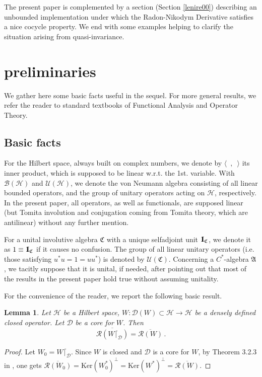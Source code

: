 \documentclass[12pt]{amsart}
\numberwithin{equation}{section}
\def\cb{{\mathcal B}}
\def\ch{{\mathcal H}}
\def\cu{{\mathcal U}}
\def\ga{{\mathfrak A}} \def\gpa{{\mathfrak a}}
\def\gc{{\mathfrak C}}
\newtheorem{lem}[thm]{Lemma}
\def\idd{{1}\!\!{\rm I}}
\begin{document}
The present paper is complemented by a section (Section \ref{lenire00}) describing an unbounded implementation under which the Radon-Nikodym Derivative satisfies a nice cocycle property. We end with some examples helping to clarify the situation arising from quasi-invariance.


\section{preliminaries}
\label{ptmgv}

We gather here some basic facts useful in the sequel. For more general results, we refer the reader to standard textbooks of Functional Analysis and Operator Theory.
\subsection{Basic facts} 
For the Hilbert space, always built on complex numbers, we denote by $\langle\,\,\,,\,\,\,\rangle$ its inner product, which is supposed to be linear w.r.t. the 1st. variable. With $\cb(\ch)$ and $\cu(\ch)$, we denote the von Neumann algebra consisting of all linear bounded operators, and the group of unitary operators acting on $\ch$, respectively. In the present paper, all operators, as well as functionals, are supposed linear (but Tomita involution and conjugation coming from Tomita theory, which are antilinear) without any further mention.

For a unital involutive algebra $\gc$ with a unique selfadjoint unit $\idd_{\gc}$, we denote it as $1\equiv\idd_{\gc}$ if it causes no confusion. The group of all linear unitary operators (i.e. those satisfying $u^*u=1=uu^*$) is denoted by $\cu(\gc)$. Concerning  a $C^*$-algebra $\ga$, we tacitly suppose that it is unital, if needed, after pointing out that most of the results in the present paper hold true without assuming unitality.

For the convenience of the reader, we report the following basic result.
\begin{lem}
\label{piuno}
Let $\mathcal H$ be a Hilbert space, $W:\mathcal D(W)\subset \mathcal H\rightarrow \mathcal H$ be a densely defined closed operator. Let $\mathcal D$ be a core for $W$. Then
$$
\overline{\mathcal R(W\lceil_\mathcal D)}=\overline{\mathcal R(W)}\,.
$$ 
\end{lem}
\begin{proof}
 Let $W_0=W\lceil_\mathcal D$. Since $W$ is closed and $\mathcal D$ is a core for $W$, by Theorem 3.2.3 in \cite{D}, one gets
$\overline{\mathcal R(W_0)}=\mbox{Ker}(W_0^*)^\bot=\mbox{Ker}(W^*)^\bot =\overline{\mathcal R(W)}$.
\end{proof}
\end{document}
